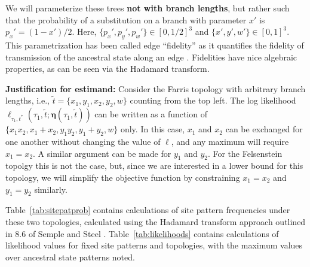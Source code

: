 \documentclass[a4paper]{article}
\newcommand{\fullAncestralSplitPartitions}{\boldsymbol\eta}
\begin{document}
We will parameterize these trees \textbf{not with branch lengths}, but rather such that the probability of a substitution on a branch with parameter $x'$ is $p_x'=(1-x')/2$.
Here, $\{p_x',p_y',p_w'\}\in[0,1/2]^3$ and $\{x',y',w'\}\in[0,1]^3$.
This parametrization has been called edge ``fidelity'' as it quantifies the fidelity of transmission of the ancestral state along an edge \cite{Matsen2007-jq}.
Fidelities have nice algebraic properties, as can be seen via the Hadamard transform.

\textbf{Justification for estimand:} Consider the Farris topology with arbitrary branch lengths, i.e., $\tilde{t}=\{x_1,y_1,x_2,y_2,w\}$ counting from the top left.
The log likelihood $\ell_{\tau_1,t^*}(\tau_1, \tilde{t}; \fullAncestralSplitPartitions(\tau_1,\tilde{t}))$ can be written as a function of $\{x_1x_2, x_1+x_2, y_1y_2, y_1+y_2, w\}$ only.
In this case, $x_1$ and $x_2$ can be exchanged for one another without changing the value of $\ell$, and any maximum will require $x_1=x_2$.
A similar argument can be made for $y_1$ and $y_2$.
For the Felsenstein topolgy this is not the case, but, since we are interested in a lower bound for this topology, we will simplify the objective function by constraining $x_1=x_2$ and $y_1=y_2$ similarly.

Table~\ref{tab:sitepatprob} contains calculations of site pattern frequencies under these two topologies, calculated using the Hadamard transform approach outlined in 8.6 of Semple and Steel \cite{Semple2003-em}.
Table~\ref{tab:likelihoods} contains calculations of likelihood values for fixed site patterns and topologies, with the maximum values over ancestral state patterns noted.
\end{document}
